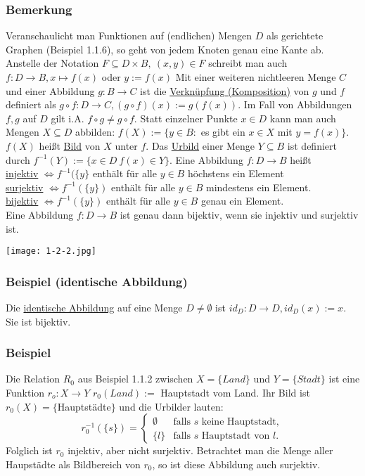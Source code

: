 \subsubsection{Bemerkung}
Veranschaulicht man Funktionen auf (endlichen) Mengen $D$ als gerichtete Graphen (Beispiel 1.1.6), so geht von jedem Knoten genau eine Kante ab.
Anstelle der Notation $F \subseteq D \times B,\ (x,y)\in F$ schreibt man auch $f:D\rightarrow B, x\mapsto f(x)$ oder $y:=f(x)$
Mit einer weiteren nichtleeren Menge $C$ und einer Abbildung $g:B\rightarrow C$ ist die \underline{Verknüpfung (Komposition)} von $g$ und $f$ definiert als $g\circ f: D\rightarrow C, (g\circ f)(x):=g(f(x))$.  Im Fall von Abbildungen $f,g$ auf $D$ gilt i.A. $f\circ g\not = g\circ f$.
Statt einzelner Punkte $x\in D$ kann man auch Mengen $X\subseteq D$ abbilden: $f(X):=\{y\in B:$ es gibt ein $x\in X$ mit $y=f(x)\}$.  $f(X)$ heißt \underline{Bild} von $X$ unter $f$.  Das \underline{Urbild} einer Menge $Y\subseteq B$ ist definiert durch $f^{-1}(Y):=\{x\in D\ f(x)\in Y\}$.  Eine Abbildung $f:D\rightarrow B$ heißt \\
\underline{injektiv} $\Leftrightarrow f^{-1}(\{y\}$ enthält für alle $y\in B$ höchstens ein Element \\
\underline{surjektiv} $\Leftrightarrow f^{-1}(\{y\})$ enthält für alle $y\in B$ mindestens ein Element. \\
\underline{bijektiv} $\Leftrightarrow f^{-1}(\{y\})$ enthält für alle $y\in B$ genau ein Element. \\
Eine Abbildung $f:D\rightarrow B$ ist genau dann bijektiv, wenn sie injektiv und surjektiv ist.\\
\begin{center}
\texttt{[image: 1-2-2.jpg]}
\end{center}
\subsubsection{Beispiel (identische Abbildung)}
Die \underline{identische Abbildung} auf eine Menge $D\not = \emptyset$ ist $id_D:D\rightarrow D,id_D(x):=x$. Sie ist bijektiv.
\subsubsection*{Beispiel}
Die Relation $R_0$ aus Beispiel 1.1.2 zwischen $X=\{Land\}$ und $Y=\{Stadt\}$ ist eine Funktion $r_o :X\rightarrow Y$ $r_0(Land):=$ Hauptstadt vom Land.  Ihr Bild ist $r_0(X)=\{$Hauptst\"{a}dte$\}$ und die Urbilder lauten:
\[r_0^{-1}(\{s\}) = \begin{cases}
\emptyset & \text{falls $s$ keine Hauptstadt},\\
\{l\}& \text{falls $s$ Hauptstadt von $l$}.
\end{cases}\]
Folglich ist $r_0$ injektiv, aber nicht surjektiv.  Betrachtet man die Menge aller Haupst\"{a}dte als Bildbereich von $r_0$, so ist diese Abbildung auch surjektiv.
